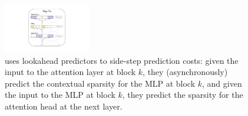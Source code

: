 \begin{figure}[]
\vspace{-2mm}
  \centering
      \hspace{0.5mm}\includegraphics[width=0.34\textwidth]{figure/dejavu.pdf}
          \vspace{-3mm}
  \caption{\name{} uses lookahead predictors to side-step prediction costs: given the input to the attention layer at block $k$, they (asynchronously) predict the contextual sparsity for the MLP at block $k$, and given the input to the MLP at block $k$, they predict the sparsity for the attention head at the next layer.}
  \label{fig:workflow_main} 
    \vspace{-4mm}
\end{figure}

